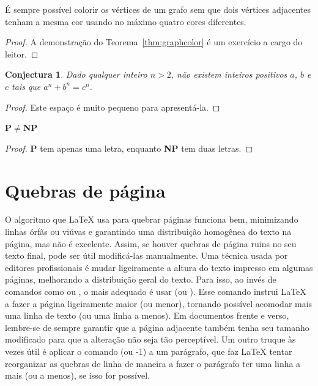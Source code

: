 \begin{theorem}
  \label{thm:graphcolor}
  É sempre possível colorir os vértices de um grafo sem que dois vértices
  adjacentes tenham a mesma cor usando no máximo quatro cores diferentes.
\end{theorem}

\begin{proof}
  A demonstração do Teorema~\ref{thm:graphcolor} é um exercício
  a cargo do leitor.
  \renewcommand\qedsymbol{} %
\end{proof}

\theoremstyle{maybe} %
\newtheorem{conjecture}{Conjectura}

\begin{conjecture}
  \label{conj:fermat}
  Dado qualquer inteiro $n > 2$, não existem inteiros positivos
  $a$, $b$ e $c$ tais que $a^n + b^n = c^n$.
\end{conjecture}

\begin{proof}
  Este espaço é muito pequeno para apresentá-la.
  \renewcommand\qedsymbol{}
\end{proof}

\begin{theorem}
  \label{thm:pnp}
  \textup{\textsf{\textbf{P$\ne$NP}}}
\end{theorem}

\begin{proof}
  \textsf{\textbf{P}} tem apenas uma letra, enquanto
  \textsf{\textbf{NP}} tem duas letras.
\end{proof}


\section{Quebras de página}
\label{sec:quebras}

O algoritmo que \LaTeX{} usa para quebrar páginas funciona bem, minimizando
linhas órfãs ou viúvas e garantindo uma distribuição homogênea do texto na
página, mas não é excelente. Assim, se houver quebras de página ruins no
seu texto final, pode ser útil modificá-las manualmente. Uma técnica usada
por editores profissionais é mudar ligeiramente a altura do texto impresso
em algumas páginas, melhorando a distribuição geral do texto. Para isso,
ao invés de comandos como  ou , o mais
adequado é usar  (ou
). Esse comando instrui \LaTeX{} a fazer a
página ligeiramente maior (ou menor), tornando possível acomodar mais
uma linha de texto (ou uma linha a menos). Em documentos frente e verso,
lembre-se de sempre garantir que a página adjacente também tenha seu
tamanho modificado para que a alteração não seja tão perceptível. Um
outro truque às vezes útil é aplicar o comando  (ou
-1) a um parágrafo, que faz \LaTeX{} tentar reorganizar as quebras de
linha de maneira a fazer o parágrafo ter uma linha a mais (ou a menos),
se isso for possível.

